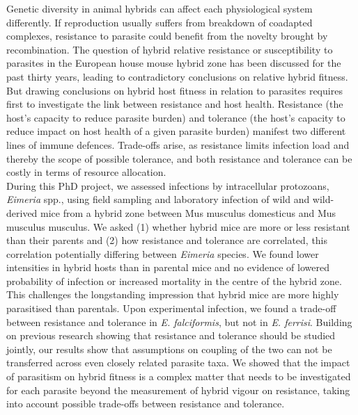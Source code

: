 Genetic diversity in animal hybrids can affect each physiological system differently. If reproduction usually suffers from breakdown of coadapted complexes, resistance to parasite could benefit from the novelty brought by recombination. The question of hybrid relative resistance or susceptibility to parasites in the European house mouse hybrid zone has been discussed for the past thirty years, leading to contradictory conclusions on relative hybrid fitness. But drawing conclusions on hybrid host fitness in relation to parasites requires first to investigate the link between resistance and host health. Resistance (the host’s capacity to reduce parasite burden) and tolerance (the host’s capacity to reduce impact on host health of a given parasite burden) manifest two different lines of immune defences. Trade-offs arise, as resistance limits infection load and thereby the scope of possible tolerance, and both resistance and tolerance can be costly in terms of resource allocation. \\
During this PhD project, we assessed infections by intracellular protozoans, \textit{Eimeria} spp., using field sampling and laboratory infection of wild and wild-derived mice from a hybrid zone between Mus musculus domesticus and Mus musculus musculus. We asked (1) whether hybrid mice are more or less resistant than their parents and (2) how resistance and tolerance are correlated, this correlation potentially differing between \textit{Eimeria} species. We found lower intensities in hybrid hosts than in parental mice and no evidence of lowered probability of infection or increased mortality in the centre of the hybrid zone. This challenges the longstanding impression that hybrid mice are more highly parasitised than parentals. Upon experimental infection, we found a trade-off between resistance and tolerance in \textit{E. falciformis}, but not in \textit{E. ferrisi}. Building on previous research showing that resistance and tolerance should be studied jointly, our results show that assumptions on coupling of the two can not be transferred across even closely related parasite taxa. We showed that the impact of parasitism on hybrid fitness is a complex matter that needs to be investigated for each parasite beyond the measurement of hybrid vigour on resistance, taking into account possible trade-offs between resistance and tolerance.
